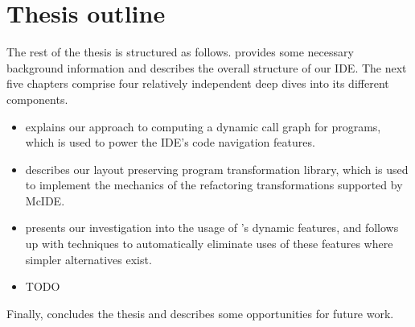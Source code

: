 \section{Thesis outline}

The rest of the thesis is structured as follows.
 provides some necessary background
information and describes the overall structure of our IDE. The next five
chapters comprise four relatively independent deep dives into its different
components.

\begin{itemize}

\item {} explains our approach to
computing a dynamic call graph for \matlab programs, which is used to power the
IDE's code navigation features.

\item {} describes our layout
preserving program transformation library, which is used to implement the
mechanics of the refactoring transformations supported by McIDE.

\item {} presents our investigation into the
usage of \matlab's dynamic features, and
 follows up with techniques to
automatically eliminate uses of these features where simpler alternatives
exist.

\item TODO

\end{itemize}

Finally,  concludes the thesis and describes some
opportunities for future work.
